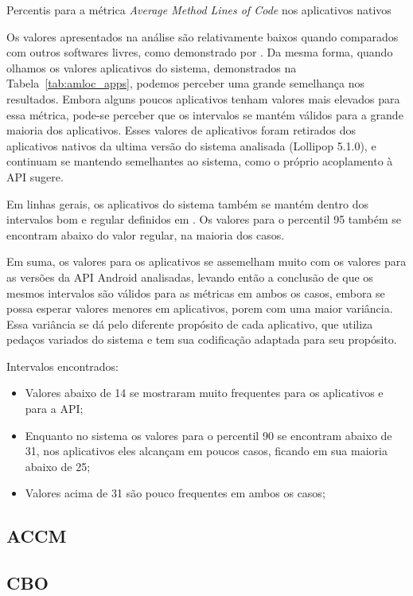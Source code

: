 \begin{table}[!htb]

\caption{Percentis para a métrica \textit{Average Method Lines of Code} nos aplicativos nativos}
\label{tab:amloc_apps}
\end{table}

Os valores apresentados na análise são relativamente baixos quando comparados com outros softwares livres, como demonstrado por . Da mesma forma, quando olhamos os valores aplicativos do sistema, demonstrados na Tabela~\ref{tab:amloc_apps}, podemos perceber uma grande semelhança nos resultados. Embora alguns poucos aplicativos tenham valores mais elevados para essa métrica, pode-se perceber que os intervalos se mantém válidos para a grande maioria dos aplicativos. Esses valores de aplicativos foram retirados dos aplicativos nativos da ultima versão do sistema analisada (Lollipop 5.1.0), e continuam se mantendo semelhantes ao sistema, como o próprio acoplamento à API sugere.

Em linhas gerais, os aplicativos do sistema também se mantém dentro dos intervalos bom e regular definidos em . Os valores para o percentil 95 também se encontram abaixo do valor regular, na maioria dos casos.

Em suma, os valores para os aplicativos se assemelham muito com os valores para as versões da API Android analisadas, levando então a conclusão de que os mesmos intervalos são válidos para as métricas em ambos os casos, embora se possa esperar valores menores em aplicativos, porem com uma maior variância. Essa variância se dá pelo diferente propósito de cada aplicativo, que utiliza pedaços variados do sistema e tem sua codificação adaptada para seu propósito.

Intervalos encontrados:

\begin{itemize}
\item Valores abaixo de 14 se mostraram muito frequentes para os aplicativos e para a API;
\item Enquanto no sistema os valores para o percentil 90 se encontram abaixo de 31, nos aplicativos eles alcançam em poucos casos, ficando em sua maioria abaixo de 25;
\item Valores acima de 31 são pouco frequentes em ambos os casos;
\end{itemize}

\subsection{ACCM} %
\subsection{CBO}
